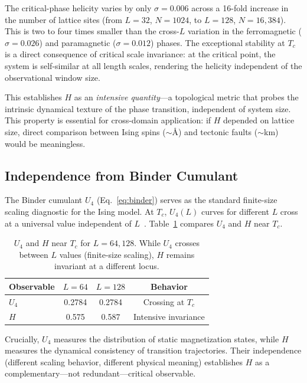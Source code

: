 \documentclass[aps,prl,twocolumn,superscriptaddress,byrevtex]{article}
\begin{document}
The critical-phase helicity varies by only $\sigma = 0.006$ across a 16-fold
increase in the number of lattice sites (from $L = 32$, $N = 1024$, to
$L = 128$, $N = 16{,}384$). This is two to four times smaller than the
cross-$L$ variation in the ferromagnetic ($\sigma = 0.026$) and paramagnetic
($\sigma = 0.012$) phases. The exceptional stability at $T_c$ is a direct
consequence of critical scale invariance: at the critical point, the system
is self-similar at all length scales, rendering the helicity independent
of the observational window size.

This establishes $H$ as an \emph{intensive quantity}---a topological metric
that probes the intrinsic dynamical texture of the phase transition, independent
of system size. This property is essential for cross-domain application: if
$H$ depended on lattice size, direct comparison between Ising spins ($\sim$\AA)
and tectonic faults ($\sim$km) would be meaningless.

\subsection{Independence from Binder Cumulant}

The Binder cumulant $U_4$ (Eq.~\ref{eq:binder}) serves as the standard finite-size
scaling diagnostic for the Ising model. At $T_c$, $U_4(L)$ curves for different
$L$ cross at a universal value independent of $L$~\cite{binder1981}. Table~\ref{tab:binder}
compares $U_4$ and $H$ near $T_c$.

\begin{table}[t]
\centering
\caption{$U_4$ and $H$ near $T_c$ for $L = 64, 128$. While $U_4$ crosses between
$L$ values (finite-size scaling), $H$ remains invariant at a different locus.}
\label{tab:binder}
\begin{tabular}{lcc|c}
\toprule
Observable    & $L = 64$ & $L = 128$ & Behavior \\
\midrule
$U_4$         & 0.2784   & 0.2784    & Crossing at $T_c$ \\
$H$           & 0.575    & 0.587     & Intensive invariance \\
\bottomrule
\end{tabular}
\end{table}

Crucially, $U_4$ measures the distribution of static magnetization states,
while $H$ measures the dynamical consistency of transition trajectories.
Their independence (different scaling behavior, different physical meaning)
establishes $H$ as a complementary---not redundant---critical observable.
\end{document}
